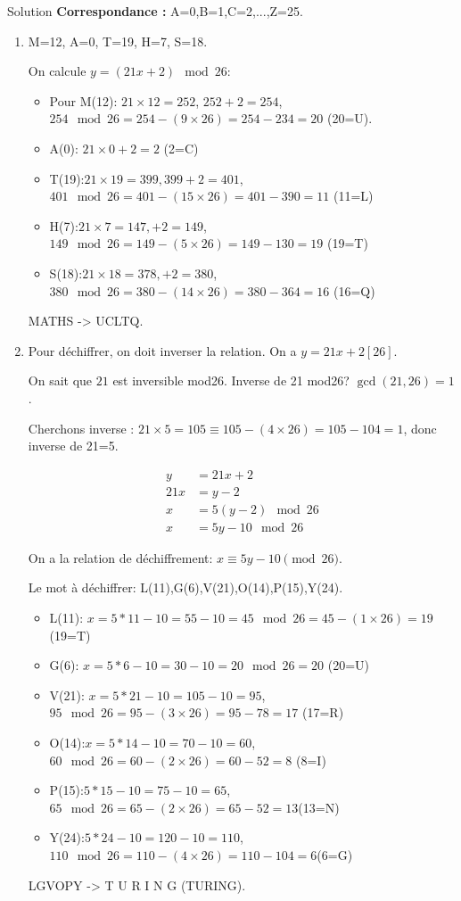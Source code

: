 \documentclass[a4paper,12pt]{article}
\begin{document}
\begin{solutionbox}{Solution}
\textbf{Correspondance :} A=0,B=1,C=2,...,Z=25.

\begin{enumerate}
    \item M=12, A=0, T=19, H=7, S=18.

    On calcule $y=(21x+2) \mod 26$:
    \begin{itemize}
    \item Pour M(12): $21 \times12=252$, $252+2=254$, $254 \mod26=254-(9\times26)=254-234=20$ (20=U).
    \item A(0): $21 \times0+2=2$ (2=C)
    \item T(19):$21 \times19=399, 399+2=401$, $401\mod26=401-(15\times26)=401-390=11$ (11=L)
    \item H(7):$21\times7=147, +2=149$, $149\mod26=149-(5\times26)=149-130=19$ (19=T)
    \item S(18):$21\times18=378, +2=380$, $380\mod26=380-(14\times26)=380-364=16$ (16=Q)
    \end{itemize}

    MATHS -> UCLTQ.

    \item Pour déchiffrer, on doit inverser la relation. On a $y=21x+2[26]$.

    On sait que $21$ est inversible mod26. Inverse de 21 mod26?
    $\gcd(21,26)=1$.

    Cherchons inverse : $21\times5=105\equiv 105-(4\times26)=105-104=1$, donc inverse de 21=5.

    \begin{align*}
        y&=21x+2\\
        21x&=y-2\\
        x&=5(y-2) \mod 26\\
        x&=5y-10 \mod 26
    \end{align*}

    On a la relation de déchiffrement: $x \equiv 5y -10 \pmod{26}$.

    Le mot à déchiffrer: L(11),G(6),V(21),O(14),P(15),Y(24).

    \begin{itemize}
        \item L(11): $x=5*11 -10=55-10=45 \mod26=45-(1\times26)=19$ (19=T)
        \item G(6): $x=5*6-10=30-10=20 \mod26=20$ (20=U)
        \item V(21): $x=5*21-10=105-10=95$, $95\mod26=95-(3\times26)=95-78=17$ (17=R)
        \item O(14):$x=5*14-10=70-10=60$, $60\mod26=60-(2\times26)=60-52=8$ (8=I)
        \item P(15):$5*15-10=75-10=65$, $65\mod26=65-(2\times26)=65-52=13$(13=N)
        \item Y(24):$5*24-10=120-10=110$, $110\mod26=110-(4\times26)=110-104=6$(6=G)
    \end{itemize}

    LGVOPY -> T U R I N G (TURING).

\end{enumerate}
\end{solutionbox}
\end{document}
